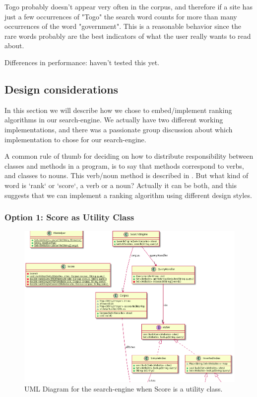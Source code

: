 Togo probably doesn't appear very often in the corpus, and therefore if a site has just a few occurrences of "Togo" the search word counts for more than many occurrences of the word "government".
This is a reasonable behavior since the rare words probably are the best indicators of what the user really wants to read about.  


Differences in performance: haven't tested this yet.

\subsection{Design considerations}
In this section we will describe how we chose to embed/implement ranking algorithms in our search-engine. We actually have two different working implementations, and there was a passionate group discussion about which implementation to chose for our search-engine.  

A common rule of thumb for deciding on how to distribute responsibility between classes and methods in a program, is to say that methods correspond to verbs, and classes to nouns. This verb/noun method is described in \cite[p.530]{BK}.
But what kind of word is `rank` or `score`, a verb or a noun? Actually it can be both, and this suggests that we can implement a ranking algorithm using different design styles.

\subsubsection{Option 1: Score as Utility Class}
\begin{figure}[t]
	\centering
	\includegraphics[width=\textwidth]{graphics/uml/ScoreAsUtilityZoom.png}
	\caption{UML Diagram for the search-engine when Score is a utility class.}
	\label{fig:uml:ScoreAsUtility}
\end{figure}

